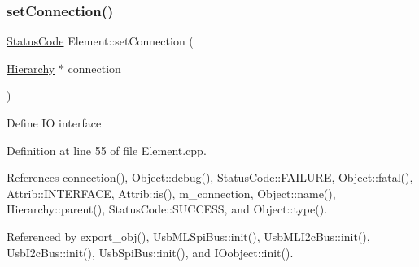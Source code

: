\subsubsection{\texorpdfstring{set\+Connection()}{setConnection()}}
{\footnotesize\ttfamily \hyperlink{classStatusCode}{Status\+Code} Element\+::set\+Connection (\begin{DoxyParamCaption}\item[{\hyperlink{classHierarchy}{Hierarchy} $\ast$}]{connection }\end{DoxyParamCaption})}

Define IO interface 

Definition at line 55 of file Element.\+cpp.



References connection(), Object\+::debug(), Status\+Code\+::\+F\+A\+I\+L\+U\+RE, Object\+::fatal(), Attrib\+::\+I\+N\+T\+E\+R\+F\+A\+CE, Attrib\+::is(), m\+\_\+connection, Object\+::name(), Hierarchy\+::parent(), Status\+Code\+::\+S\+U\+C\+C\+E\+SS, and Object\+::type().



Referenced by export\+\_\+obj(), Usb\+M\+L\+Spi\+Bus\+::init(), Usb\+M\+L\+I2c\+Bus\+::init(), Usb\+I2c\+Bus\+::init(), Usb\+Spi\+Bus\+::init(), and I\+Oobject\+::init().


